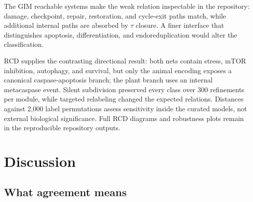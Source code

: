 \documentclass{ws-jbcb}
\numberwithin{equation}{section}
\newcommand{\TAU}{\tau}
\begin{document}
\begin{table}[t]
\end{table}

The GIM reachable systems make the weak relation inspectable in the repository:
damage, checkpoint, repair, restoration, and cycle-exit paths match, while
additional internal paths are absorbed by $\TAU$ closure. A finer interface that
distinguishes apoptosis, differentiation, and endoreduplication would alter the
classification.

RCD supplies the contrasting directional result: both nets contain stress,
mTOR inhibition, autophagy, and survival, but only the animal encoding exposes a
canonical caspase-apoptosis branch; the plant branch uses an internal metacaspase
event. Silent subdivision preserved every class over 300 refinements per module,
while targeted relabeling changed the expected relations. Distances against
2,000 label permutations assess sensitivity inside the curated models, not
external biological significance. Full RCD diagrams and robustness plots remain
in the reproducible repository outputs.

\section{Discussion}\label{sec:discussion}

\subsection{What agreement means}
\label{sec:discussion-meaning}
\end{document}
